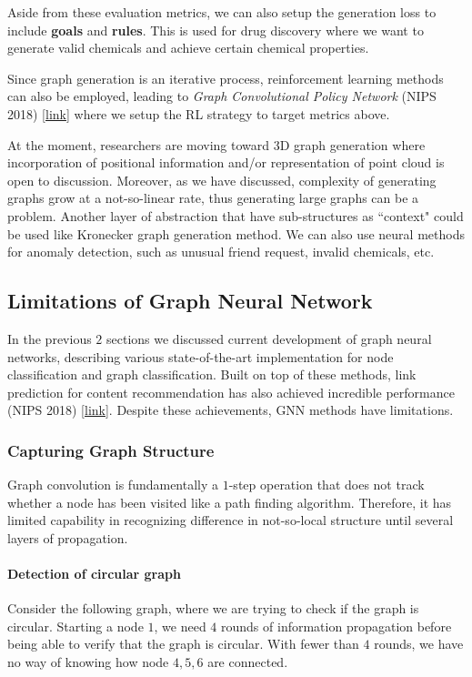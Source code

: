 Aside from these evaluation metrics, we can also setup the generation loss to include \textbf{goals} and \textbf{rules}. This is used for drug discovery where we want to generate valid chemicals and achieve certain chemical properties.

Since graph generation is an iterative process, reinforcement learning methods can also be employed, leading to \textit{Graph Convolutional Policy Network} (NIPS 2018) \href{https://arxiv.org/pdf/1806.02473.pdf}{[link]} where we setup the RL strategy to target metrics above.

At the moment, researchers are moving toward 3D graph generation where incorporation of positional information and/or representation of point cloud is open to discussion. Moreover, as we have discussed, complexity of generating graphs grow at a not-so-linear rate, thus generating large graphs can be a problem. Another layer of abstraction that have sub-structures as ``context" could be used like Kronecker graph generation method. We can also use neural methods for anomaly detection, such as unusual friend request, invalid chemicals, etc.

\subsection{Limitations of Graph Neural Network}

In the previous $2$ sections we discussed current development of graph neural networks, describing various state-of-the-art implementation for node classification and graph classification. Built on top of these methods, link prediction for content recommendation has also achieved incredible performance (NIPS 2018) \href{https://papers.nips.cc/paper/7763-link-prediction-based-on-graph-neural-networks}{[link]}. Despite these achievements, GNN methods have limitations. 

\subsubsection{Capturing Graph Structure}

Graph convolution is fundamentally a $1$-step operation that does not track whether a node has been visited like a path finding algorithm. Therefore, it has limited capability in recognizing difference in not-so-local structure until several layers of propagation. 

\paragraph{Detection of circular graph} Consider the following graph, where we are trying to check if the graph is circular. Starting a node $1$, we need $4$ rounds of information propagation before being able to verify that the graph is circular. With fewer than $4$ rounds, we have no way of knowing how node $4, 5, 6$ are connected.


